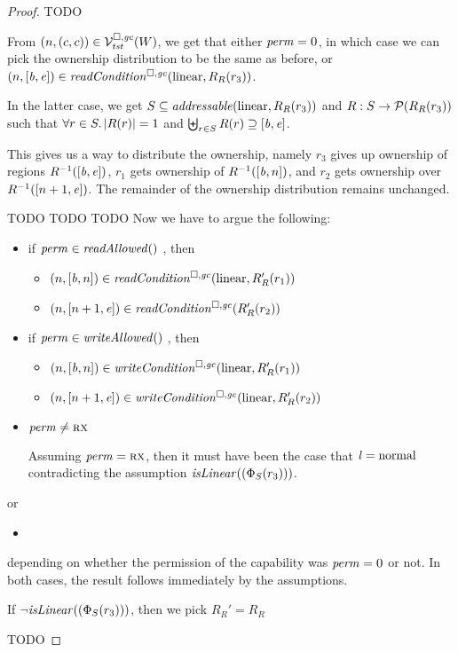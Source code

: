 \begin{proof}
  TODO
  
  From $\left(n,(c,c)\right) \in \mathcal{V}^{\square,\mathit{gc}}_{\mathit{tst}}(W)$, we get that either $\mathit{perm} = \textsc{0}$, in which case we can pick the ownership distribution to be the same as before, or $\npair{[\baddr,\eaddr]} \in \readCond{\linear,R_R(r_3)}$.

    In the latter case, we get $S \subseteq \addressable{\linear,R_R(r_3)}$ and $R : S \rightarrow \mathcal{P}(R_R(r_3))$ such that $\forall r \in S \ldotp |R(r)| = 1$ and $\biguplus_{r\in S} R(r) \supseteq [\mathit{b},\mathit{e}]$.

    This gives us a way to distribute the ownership, namely $r_3$ gives up ownership of regions $R^{-1}([\mathit{b},\mathit{e}])$, $r_1$ gets ownership of $R^{-1}([\mathit{b},n])$, and $r_2$ gets ownership over $R^{-1}([n+1,\mathit{e}])$.
    The remainder of the ownership distribution remains unchanged.

TODO TODO TODO     
    Now we have to argue the following:
    \begin{itemize}
    \item if $\perm \in \readAllowed$, then
      \begin{itemize}
      \item $\npair{[\baddr,n]} \in \readCond{\linear,R_R'(r_1)}$
      \item $\npair{[n+1,\eaddr]} \in \readCond{R_R'(r_2)}$
      \end{itemize}
      
    \item if $\perm \in \writeAllowed$, then
      \begin{itemize}
      \item $\npair{[\baddr,n]} \in \writeCond{\linear,R_R'(r_1)}$
      \item $\npair{[n+1,\eaddr]} \in \writeCond{\linear,R_R'(r_2)}$
      \end{itemize}
    \item $\mathit{perm} \neq \textsc{rx}$

      Assuming $\mathit{perm} = \textsc{rx}$, then it must have been the case that $\mathit{l} = \mathrm{normal}$ contradicting the assumption $\isLinear{(\Phi_S(r_3))}$.
      
    \end{itemize}
    or
    \begin{itemize}
    \item 
    \end{itemize}
    depending on whether the permission of the capability was $\mathit{perm} = \textsc{0}$
    or not. In both cases, the result follows immediately by the assumptions.

    If $\neg \isLinear{(\Phi_S(r_3))}$, then we pick $R_R' = R_R$

    TODO

\end{proof}

